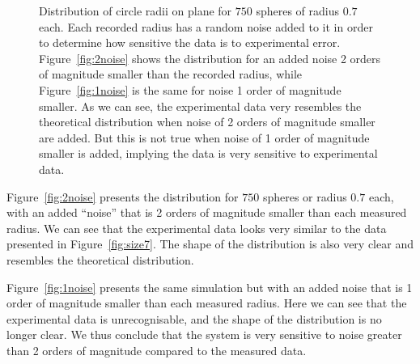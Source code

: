 \documentclass[journal]{IEEEtran}
\begin{document}
\begin{figure}%
  \centering
  \centering
  \caption{Distribution of circle radii on plane for $750$ spheres of radius $0.7$
    each. Each recorded radius has a random noise added to it in order to
    determine how sensitive the data is to experimental
    error. Figure~\ref{fig:2noise} shows the distribution for an added noise 2
    orders of magnitude smaller than the recorded radius, while
    Figure~\ref{fig:1noise} is the same for noise 1 order of magnitude smaller. As
    we can see, the experimental data very resembles the theoretical
    distribution when noise of 2 orders of magnitude smaller are added. But this
    is not true when noise of 1 order of magnitude smaller is added, implying
    the data is very sensitive to experimental data.}
  \label{fig:noiseplots}
\end{figure}

Figure~\ref{fig:2noise} presents the distribution for $750$ spheres or radius
$0.7$ each, with an added ``noise'' that is 2 orders of magnitude smaller than
each measured radius. We can see that the experimental data looks very similar
to the data presented in Figure~\ref{fig:size7}. The shape of the distribution
is also very clear and resembles the theoretical distribution.

Figure~\ref{fig:1noise} presents the same simulation but with an added noise
that is 1 order of magnitude smaller than each measured radius. Here we can see
that the experimental data is unrecognisable, and the shape of the distribution
is no longer clear. We thus conclude that the system is very sensitive to noise
greater than 2 orders of magnitude compared to the measured data.
\end{document}
